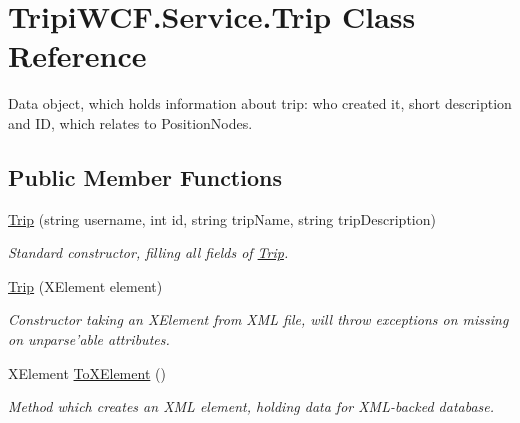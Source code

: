 \hypertarget{class_tripi_w_c_f_1_1_service_1_1_trip}{
\section{TripiWCF.Service.Trip Class Reference}
\label{class_tripi_w_c_f_1_1_service_1_1_trip}
}


Data object, which holds information about trip: who created it, short description and ID, which relates to PositionNodes.  
\subsection*{Public Member Functions}
\begin{DoxyCompactItemize}
\item 
\hyperlink{class_tripi_w_c_f_1_1_service_1_1_trip_a2fe85e5fde97ea9a387bad11ca5dd324}{Trip} (string username, int id, string tripName, string tripDescription)
\begin{DoxyCompactList}\small\item\em Standard constructor, filling all fields of \hyperlink{class_tripi_w_c_f_1_1_service_1_1_trip}{Trip}. \item\end{DoxyCompactList}\item 
\hyperlink{class_tripi_w_c_f_1_1_service_1_1_trip_a1d281550721fa997491ad341387850c5}{Trip} (XElement element)
\begin{DoxyCompactList}\small\item\em Constructor taking an XElement from XML file, will throw exceptions on missing on unparse'able attributes. \item\end{DoxyCompactList}\item 
XElement \hyperlink{class_tripi_w_c_f_1_1_service_1_1_trip_af533edf814444221051ce081d025f989}{ToXElement} ()
\begin{DoxyCompactList}\small\item\em Method which creates an XML element, holding data for XML-\/backed database. \item\end{DoxyCompactList}\end{DoxyCompactItemize}
